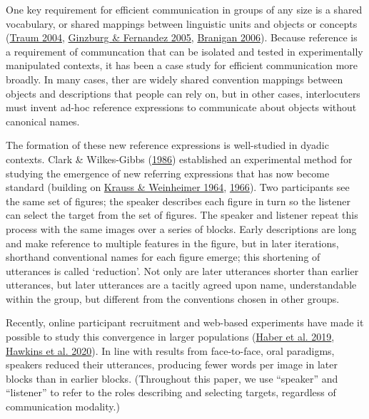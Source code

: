 \documentclass[
  english,
  a4paper,
]{article}
\begin{document}
One key requirement for efficient communication in groups of any size is a shared vocabulary, or shared mappings between linguistic units and objects or concepts (\protect\hyperlink{ref-traum2004}{Traum 2004}, \protect\hyperlink{ref-ginzburg2005}{Ginzburg \& Fernandez 2005}, \protect\hyperlink{ref-branigan2006}{Branigan 2006}). Because reference is a requirement of communcation that can be isolated and tested in experimentally manipulated contexts, it has been a case study for efficient communication more broadly. In many cases, ther are widely shared convention mappings between objects and descriptions that people can rely on, but in other cases, interlocuters must invent ad-hoc reference expressions to communicate about objects without canonical names.

The formation of these new reference expressions is well-studied in dyadic contexts. Clark \& Wilkes-Gibbs (\protect\hyperlink{ref-clarkReferringCollaborativeProcess1986}{1986}) established an experimental method for studying the emergence of new referring expressions that has now become standard (building on \protect\hyperlink{ref-kraussChangesReferencePhrases1964}{Krauss \& Weinheimer 1964}, \protect\hyperlink{ref-kraussConcurrentFeedbackConfirmation1966}{1966}). Two participants see the same set of figures; the speaker describes each figure in turn so the listener can select the target from the set of figures. The speaker and listener repeat this process with the same images over a series of blocks. Early descriptions are long and make reference to multiple features in the figure, but in later iterations, shorthand conventional names for each figure emerge; this shortening of utterances is called `reduction'. Not only are later utterances shorter than earlier utterances, but later utterances are a tacitly agreed upon name, understandable within the group, but different from the conventions chosen in other groups.

Recently, online participant recruitment and web-based experiments have made it possible to study this convergence in larger populations (\protect\hyperlink{ref-haber2019}{Haber et al. 2019}, \protect\hyperlink{ref-hawkinsCharacterizingDynamicsLearning2020}{Hawkins et al. 2020}). In line with results from face-to-face, oral paradigms, speakers reduced their utterances, producing fewer words per image in later blocks than in earlier blocks. (Throughout this paper, we use ``speaker'' and ``listener'' to refer to the roles describing and selecting targets, regardless of communication modality.)
\end{document}
